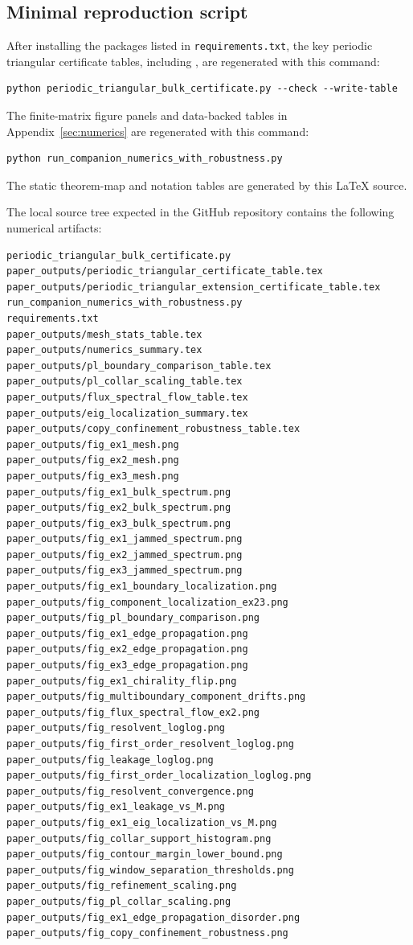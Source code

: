 \documentclass[11pt]{article}
\numberwithin{equation}{section}
\theoremstyle{definition}
\theoremstyle{remark}
\begin{document}
\subsection{Minimal reproduction script}\label{app:minimal_reproduction_script}
After installing the packages listed in \texttt{requirements.txt}, the key periodic triangular
certificate tables, including
, are
regenerated with this command:
\begin{verbatim}
python periodic_triangular_bulk_certificate.py --check --write-table
\end{verbatim}
The finite-matrix figure panels and data-backed tables in Appendix~\ref{sec:numerics} are
regenerated with this command:
\begin{verbatim}
python run_companion_numerics_with_robustness.py
\end{verbatim}
The static theorem-map and notation tables are generated by this \LaTeX{} source.

The local source tree expected in the GitHub repository contains the following numerical artifacts:
\begin{verbatim}
periodic_triangular_bulk_certificate.py
paper_outputs/periodic_triangular_certificate_table.tex
paper_outputs/periodic_triangular_extension_certificate_table.tex
run_companion_numerics_with_robustness.py
requirements.txt
paper_outputs/mesh_stats_table.tex
paper_outputs/numerics_summary.tex
paper_outputs/pl_boundary_comparison_table.tex
paper_outputs/pl_collar_scaling_table.tex
paper_outputs/flux_spectral_flow_table.tex
paper_outputs/eig_localization_summary.tex
paper_outputs/copy_confinement_robustness_table.tex
paper_outputs/fig_ex1_mesh.png
paper_outputs/fig_ex2_mesh.png
paper_outputs/fig_ex3_mesh.png
paper_outputs/fig_ex1_bulk_spectrum.png
paper_outputs/fig_ex2_bulk_spectrum.png
paper_outputs/fig_ex3_bulk_spectrum.png
paper_outputs/fig_ex1_jammed_spectrum.png
paper_outputs/fig_ex2_jammed_spectrum.png
paper_outputs/fig_ex3_jammed_spectrum.png
paper_outputs/fig_ex1_boundary_localization.png
paper_outputs/fig_component_localization_ex23.png
paper_outputs/fig_pl_boundary_comparison.png
paper_outputs/fig_ex1_edge_propagation.png
paper_outputs/fig_ex2_edge_propagation.png
paper_outputs/fig_ex3_edge_propagation.png
paper_outputs/fig_ex1_chirality_flip.png
paper_outputs/fig_multiboundary_component_drifts.png
paper_outputs/fig_flux_spectral_flow_ex2.png
paper_outputs/fig_resolvent_loglog.png
paper_outputs/fig_first_order_resolvent_loglog.png
paper_outputs/fig_leakage_loglog.png
paper_outputs/fig_first_order_localization_loglog.png
paper_outputs/fig_resolvent_convergence.png
paper_outputs/fig_ex1_leakage_vs_M.png
paper_outputs/fig_ex1_eig_localization_vs_M.png
paper_outputs/fig_collar_support_histogram.png
paper_outputs/fig_contour_margin_lower_bound.png
paper_outputs/fig_window_separation_thresholds.png
paper_outputs/fig_refinement_scaling.png
paper_outputs/fig_pl_collar_scaling.png
paper_outputs/fig_ex1_edge_propagation_disorder.png
paper_outputs/fig_copy_confinement_robustness.png
\end{verbatim}
\end{document}
